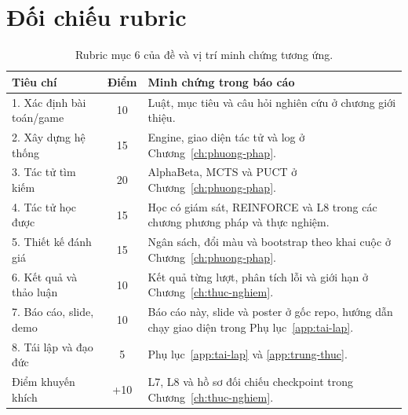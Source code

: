 \chapter{Đối chiếu rubric}
\label{app:rubric}

\begin{table}[H]
  \centering
  \small
  \begin{tabularx}{\textwidth}{l c X}
    \toprule
    \textbf{Tiêu chí} & \textbf{Điểm} & \textbf{Minh chứng trong báo cáo} \\
    \midrule
    1. Xác định bài toán/game & 10 & Luật, mục tiêu và câu hỏi nghiên cứu ở chương giới thiệu. \\
    2. Xây dựng hệ thống & 15 & Engine, giao diện tác tử và log ở Chương~\ref{ch:phuong-phap}. \\
    3. Tác tử tìm kiếm & 20 & AlphaBeta, MCTS và PUCT ở Chương~\ref{ch:phuong-phap}. \\
    4. Tác tử học được & 15 & Học có giám sát, REINFORCE và L8 trong các chương phương pháp và thực nghiệm. \\
    5. Thiết kế đánh giá & 15 & Ngân sách, đổi màu và bootstrap theo khai cuộc ở Chương~\ref{ch:phuong-phap}. \\
    6. Kết quả và thảo luận & 10 & Kết quả từng lượt, phân tích lỗi và giới hạn ở Chương~\ref{ch:thuc-nghiem}. \\
    7. Báo cáo, slide, demo & 10 & Báo cáo này, slide và poster ở gốc repo, hướng dẫn chạy giao diện trong Phụ lục~\ref{app:tai-lap}. \\
    8. Tái lập và đạo đức & 5 & Phụ lục~\ref{app:tai-lap} và \ref{app:trung-thuc}. \\
    Điểm khuyến khích & +10 & L7, L8 và hồ sơ đối chiếu checkpoint trong Chương~\ref{ch:thuc-nghiem}. \\
    \bottomrule
  \end{tabularx}
  \caption{Rubric mục 6 của đề và vị trí minh chứng tương ứng.}
\end{table}

